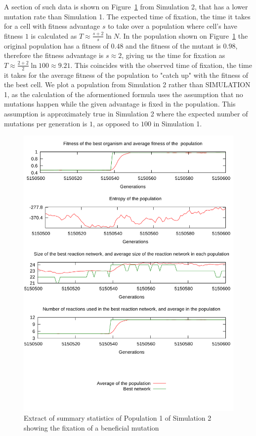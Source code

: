 \documentclass[10pt,a4paper]{article}
\begin{document}
A section of such data is shown on Figure~\ref{fig:fixation} from Simulation 2, that has a lower mutation rate than Simulation 1. The expected time of fixation, the time it takes for a cell with fitness advantage $s$ to take over a population where cell's have fitness $1$ is calculated as $T \approx \frac{s+2}{s}\ln N$. \cite{barteklecture} In the population shown on Figure~\ref{fig:fixation} the original population has a fitness of $0.48$ and the fitness of the mutant is $0.98$, therefore the fitness advantage is $s\approx2$, giving us the time for fixation as $T\approx \frac{2+2}{2}\ln 100 \approx 9.21$. This coincides with the observed time of fixation, the time it takes for the average fitness of the population to "catch up" with the fitness of the best cell. We plot a population from Simulation 2 rather than SIMULATION 1, as the calculation of the aformentioned formula uses the assumption that no mutations happen while the given advantage is fixed in the population. This assumption is approximately true in Simulation 2 where the expected number of mutations per generation is $1$, as opposed to $100$ in Simulation 1.

\begin{figure}[htpb]
	\centering
	\includegraphics[width=0.8\linewidth]{fixation.pdf}
	\caption{Extract of summary statistics of Population 1 of Simulation 2 showing the fixation of a beneficial mutation}
	\label{fig:fixation}
\end{figure}
\end{document}

